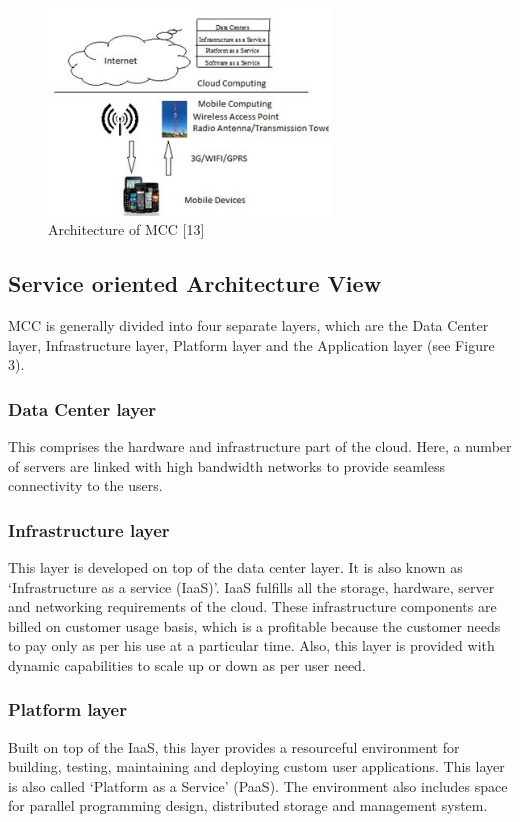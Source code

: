 \documentclass[10pt, conference, compsocconf]{IEEEtran}
\begin{document}
\begin{figure}[h!]
\begin{center}
    \includegraphics[scale=1,width=75mm]{fig2ver2}
\end{center}
\caption{Architecture of MCC [13]}
\end{figure}

\subsection{Service oriented Architecture View}
MCC is generally divided into four separate layers, which are the Data Center layer, Infrastructure layer, Platform layer and the Application layer (see Figure 3).
\subsubsection{Data Center layer}
This comprises the hardware and infrastructure part of the cloud. Here, a number of servers are linked with high bandwidth networks to provide seamless connectivity to the users.
\subsubsection{Infrastructure layer}
This layer is developed on top of the data center layer. It is also known as `Infrastructure as a service (IaaS)'. IaaS fulfills all the storage, hardware, server and networking requirements of the cloud. These infrastructure components are billed on customer usage basis, which is a profitable because the customer needs to pay only as per his use at a particular time. Also, this layer is provided with dynamic capabilities to scale up or down as per user need.
\subsubsection{Platform layer}
Built on top of the IaaS, this layer provides a resourceful environment for building, testing, maintaining and deploying custom user applications. This layer is also called `Platform as a Service' (PaaS). The environment also includes space for parallel programming design, distributed storage and management system.
\end{document}
